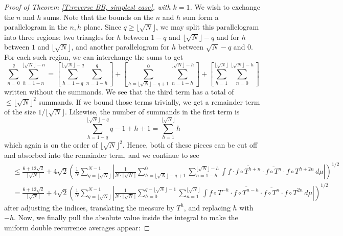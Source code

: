 \documentclass[11pt, oneside]{amsart}   	%
\newcommand{\1}{\mathbbm{1}}
\newcommand{\floor}[1]{\lfloor#1\rfloor}
\theoremstyle{definition}
\begin{document}
\begin{proof}[Proof of Theorem \ref{T:reverse BB, simplest case}, with $k=1$]
We wish to exchange the $n$ and $h$ sums. Note that the bounds on the $n$ and $h$ sum form a parallelogram in the $n,h$ plane. Since $q \geq \floor{\sqrt{N}}$, we may split this parallelogram into three regions: two triangles for $h$ between $1-q$ and $\floor{\sqrt{N}}-q$ and for $h$ between $1$ and $\floor{\sqrt{N}}$, and another parallelogram for $h$ between $\sqrt{N}-q$ and $0$. For each such region, we can interchange the sums to get
$$\sum_{n=0}^q \sum_{h=1-n}^{\floor{\sqrt{N}}-n} = \left[\sum_{h = 1-q}^{\floor{\sqrt{N}}-q} \sum_{n=1-h}^q \right] + \left[\sum_{h = \floor{\sqrt{N}}-q+1 }^{0} \sum_{n=1-h}^{\floor{\sqrt{N}}-h}\right] + \left[\sum_{h = 1}^{\floor{\sqrt{N}}} \sum_{n=0}^{\floor{\sqrt{N}}-h} \right]$$
written without the summands. We see that the third term has a total of $\leq \floor{\sqrt{N}}^2$ summands. If we bound those terms trivially, we get a remainder term of the size $1/\floor{\sqrt{N}}$. Likewise, the number of summands in the first term is
$$\sum_{h = 1-q}^{\floor{\sqrt{N}}-q} q-1+h +1 = \sum_{h = 1}^{\floor{\sqrt{N}}}h$$
which again is on the order of $\floor{\sqrt{N}}^2$. Hence, both of these pieces can be cut off and absorbed into the remainder term, and we continue to see
\begin{align*}
&\leq \frac{6 +12\sqrt{2}}{\floor{\sqrt{N}}} + 4\sqrt{2} \left(  \frac{1}{N} \sum_{q=\floor{\sqrt{N}}}^{N-1} \left|\frac{1}{N \cdot \floor{\sqrt{N}}}  \sum_{h = \floor{\sqrt{N}}-q+1}^{0} \sum_{n=1-h}^{\floor{\sqrt{N}}-h} \int f \cdot \overline{f\circ T^{h+n}} \cdot \overline{f \circ T^n} \cdot f\circ T^{h+2n} \, d\mu \right| \right)^{1/2} \\
&= \frac{6 +12\sqrt{2}}{\floor{\sqrt{N}}} + 4\sqrt{2} \left(  \frac{1}{N} \sum_{q=\floor{\sqrt{N}}}^{N-1} \left|\frac{1}{N \cdot \floor{\sqrt{N}}}  \sum_{h = 0}^{q-\floor{\sqrt{N}}-1}\sum_{n=1}^{\floor{\sqrt{N}}} \int f\circ T^{-h} \cdot \overline{f\circ T^{n-h}} \cdot \overline{f \circ T^{n}} \cdot f\circ T^{2n} \, d\mu \right| \right)^{1/2}
\end{align*}
after adjusting the indices, translating the measure by $T^{h}$, and replacing $h$ with $-h$.
Now, we finally pull the absolute value inside the integral to make the uniform double recurrence averages appear:


\end{proof}
\end{document}
